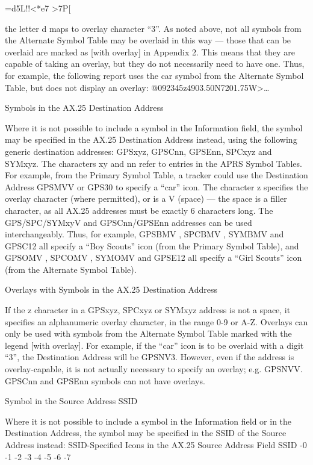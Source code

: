 =d5L!!<*e7 >7P[

the letter d maps to overlay character “3”.
As noted above, not all symbols from the Alternate Symbol Table may be
overlaid in this way — those that can be overlaid are marked as [with overlay]
in Appendix 2. This means that they are capable of taking an overlay, but
they do not necessarily need to have one. Thus, for example, the following
report uses the car symbol from the Alternate Symbol Table, but does not
display an overlay:
@092345z4903.50N\07201.75W>…

Symbols in the
AX.25 Destination
Address

Where it is not possible to include a symbol in the Information field, the
symbol may be specified in the AX.25 Destination Address instead, using the
following generic destination addresses: GPSxyz, GPSCnn, GPSEnn,
SPCxyz and SYMxyz.
The characters xy and nn refer to entries in the APRS Symbol Tables. For
example, from the Primary Symbol Table, a tracker could use the Destination
Address GPSMVV or GPS30 to specify a “car” icon.
The character z specifies the overlay character (where permitted), or is a V
(space) — the space is a filler character, as all AX.25 addresses must be
exactly 6 characters long.
The GPS/SPC/SYMxyV and GPSCnn/GPSEnn addresses can be used
interchangeably. Thus, for example, GPSBMV , SPCBMV , SYMBMV and
GPSC12 all specify a “Boy Scouts” icon (from the Primary Symbol Table),
and GPSOMV , SPCOMV , SYMOMV and GPSE12 all specify a “Girl Scouts”
icon (from the Alternate Symbol Table).

Overlays with
Symbols in the
AX.25 Destination
Address

If the z character in a GPSxyz, SPCxyz or SYMxyz address is not a space,
it specifies an alphanumeric overlay character, in the range 0-9 or A-Z.
Overlays can only be used with symbols from the Alternate Symbol Table
marked with the legend [with overlay].
For example, if the “car” icon is to be overlaid with a digit “3”, the
Destination Address will be GPSNV3.
However, even if the address is overlay-capable, it is not actually necessary
to specify an overlay; e.g. GPSNVV.
GPSCnn and GPSEnn symbols can not have overlays.


Symbol in the
Source Address
SSID

Where it is not possible to include a symbol in the Information field or in the
Destination Address, the symbol may be specified in the SSID of the Source
Address instead:
SSID-Specified Icons in the AX.25 Source Address Field
SSID
-0
-1
-2
-3
-4
-5
-6
-7

